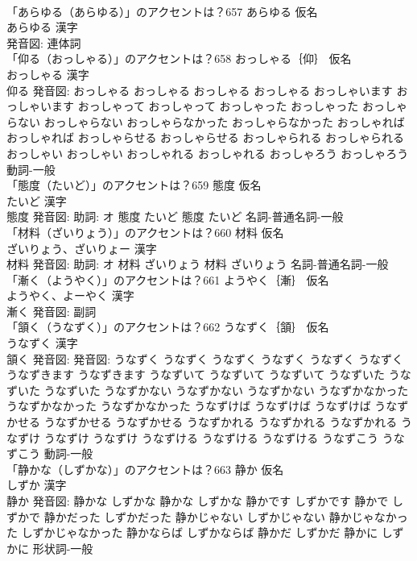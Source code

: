 \documentclass[8pt]{extreport}
\begin{document}
\begin{CJK}{UTF8}{min}
\\	「あらゆる（あらゆる）」のアクセントは？657	あらゆる 仮名　
\\	あらゆる 漢字　
\\	発音図:							連体詞 
\\	「仰る（おっしゃる）」のアクセントは？658	おっしゃる｛仰｝ 仮名　
\\	おっしゃる 漢字　
\\	仰る 発音図:	おっしゃる おっしゃる		おっしゃる おっしゃる おっしゃいます おっしゃいます おっしゃって おっしゃって おっしゃった おっしゃった おっしゃらない おっしゃらない おっしゃらなかった おっしゃらなかった おっしゃれば おっしゃれば おっしゃらせる おっしゃらせる おっしゃられる おっしゃられる おっしゃい おっしゃい おっしゃれる おっしゃれる おっしゃろう おっしゃろう				動詞-一般 
\\	「態度（たいど）」のアクセントは？659	態度 仮名　
\\	たいど 漢字　
\\	態度 発音図: 助詞: オ	態度 たいど		態度 たいど				名詞-普通名詞-一般 
\\	「材料（ざいりょう）」のアクセントは？660	材料 仮名　
\\	ざいりょう、ざいりょー 漢字　
\\	材料 発音図: 助詞: オ	材料 ざいりょう		材料 ざいりょう				名詞-普通名詞-一般 
\\	「漸く（ようやく）」のアクセントは？661	ようやく｛漸｝ 仮名　
\\	ようやく、よーやく 漢字　
\\	漸く 発音図:							副詞 
\\	「頷く（うなずく）」のアクセントは？662	うなずく｛頷｝ 仮名　
\\	うなずく 漢字　
\\	頷く 発音図: 発音図:	うなずく うなずく うなずく		うなずく うなずく うなずく うなずきます うなずきます うなずいて うなずいて うなずいて うなずいた うなずいた うなずいた うなずかない うなずかない うなずかない うなずかなかった うなずかなかった うなずかなかった うなずけば うなずけば うなずけば うなずかせる うなずかせる うなずかせる うなずかれる うなずかれる うなずかれる うなずけ うなずけ うなずけ うなずける うなずける うなずける うなずこう うなずこう				動詞-一般 
\\	「静かな（しずかな）」のアクセントは？663	静か 仮名　
\\	しずか 漢字　
\\	静か 発音図:	静かな しずかな		静かな しずかな 静かです しずかです 静かで しずかで 静かだった しずかだった 静かじゃない しずかじゃない 静かじゃなかった しずかじゃなかった 静かならば しずかならば 静かだ しずかだ 静かに しずかに				形状詞-一般 

\end{CJK}
\end{document}
